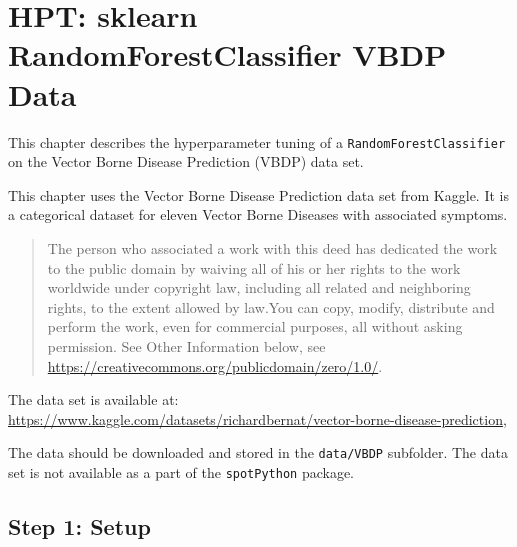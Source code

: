 \documentclass[
  letterpaper,
  DIV=11,
  numbers=noendperiod]{scrreprt}
\begin{document}
\hypertarget{sec-hpt-random-forest-classifier}{%
\chapter{HPT: sklearn RandomForestClassifier VBDP
Data}\label{sec-hpt-random-forest-classifier}}

This chapter describes the hyperparameter tuning of a
\texttt{RandomForestClassifier} on the Vector Borne Disease Prediction
(VBDP) data set.

\begin{tcolorbox}[enhanced jigsaw, left=2mm, title=\textcolor{quarto-callout-important-color}{\faExclamation}\hspace{0.5em}{Vector Borne Disease Prediction Data Set}, titlerule=0mm, toprule=.15mm, leftrule=.75mm, colbacktitle=quarto-callout-important-color!10!white, colback=white, arc=.35mm, toptitle=1mm, bottomtitle=1mm, colframe=quarto-callout-important-color-frame, bottomrule=.15mm, rightrule=.15mm, breakable, coltitle=black, opacitybacktitle=0.6, opacityback=0]

This chapter uses the Vector Borne Disease Prediction data set from
Kaggle. It is a categorical dataset for eleven Vector Borne Diseases
with associated symptoms.

\begin{quote}
The person who associated a work with this deed has dedicated the work
to the public domain by waiving all of his or her rights to the work
worldwide under copyright law, including all related and neighboring
rights, to the extent allowed by law.You can copy, modify, distribute
and perform the work, even for commercial purposes, all without asking
permission. See Other Information below, see
\url{https://creativecommons.org/publicdomain/zero/1.0/}.
\end{quote}

The data set is available at:
\url{https://www.kaggle.com/datasets/richardbernat/vector-borne-disease-prediction},

The data should be downloaded and stored in the \texttt{data/VBDP}
subfolder. The data set is not available as a part of the
\texttt{spotPython} package.

\end{tcolorbox}

\hypertarget{sec-setup-16}{%
\section{Step 1: Setup}\label{sec-setup-16}}
\end{document}
